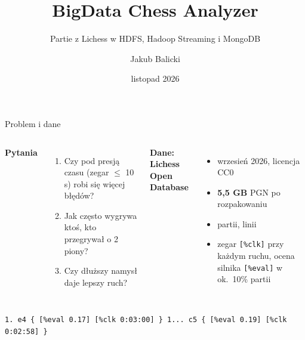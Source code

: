 \documentclass[aspectratio=169,11pt]{beamer}
\title{BigData Chess Analyzer}
\subtitle{Partie z Lichess w HDFS, Hadoop Streaming i MongoDB}
\author{Jakub Balicki}
\institute{Big Data, projekt 1}
\date{listopad 2026}
\newcommand{\kod}[1]{\texttt{#1}}
\begin{document}
\maketitle

\begin{frame}{Problem i dane}
\begin{columns}[T]
\textbf{Pytania}
\begin{enumerate}
\item Czy pod presją czasu (zegar $\le$ 10 s) robi się więcej błędów?
\item Jak często wygrywa ktoś, kto przegrywał o 2 piony?
\item Czy dłuższy namysł daje lepszy ruch?
\end{enumerate}
\textbf{Dane: Lichess Open Database}
\begin{itemize}
\item wrzesień 2026, licencja CC0
\item \textbf{5,5 GB} PGN po rozpakowaniu
\item \textbf{\nGames} partii, \nMapInput{} linii
\item zegar \kod{[\%clk]} przy każdym ruchu, ocena silnika \kod{[\%eval]} w ok.\ 10\% partii
\end{itemize}
\end{columns}
\vspace{0.6em}
{\small\kod{1. e4 \{ [\%eval 0.17] [\%clk 0:03:00] \} 1... c5 \{ [\%eval 0.19] [\%clk 0:02:58] \}}}
\end{frame}
\end{document}
